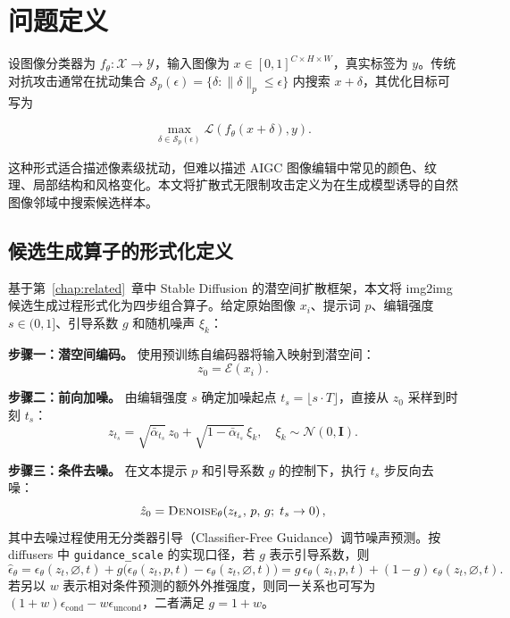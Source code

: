 \documentclass[type=bachelor,oneside]{fduthesis}
\begin{document}
\section{问题定义}

设图像分类器为 $f_\theta:\mathcal{X}\rightarrow\mathcal{Y}$，输入图像为 $x\in[0,1]^{C\times H\times W}$，真实标签为 $y$。传统对抗攻击通常在扰动集合 $\mathcal{S}_p(\epsilon)=\{\delta:\|\delta\|_p\leq\epsilon\}$ 内搜索 $x+\delta$，其优化目标可写为

\begin{equation}
  \max_{\delta \in \mathcal{S}_p(\epsilon)}
  \mathcal{L}(f_\theta(x+\delta),y).
  \label{eq:lp_attack_objective}
\end{equation}

这种形式适合描述像素级扰动，但难以描述 AIGC 图像编辑中常见的颜色、纹理、局部结构和风格变化。本文将扩散式无限制攻击定义为在生成模型诱导的自然图像邻域中搜索候选样本。

\subsection{候选生成算子的形式化定义}

基于第~\ref{chap:related}~章中 Stable Diffusion 的潜空间扩散框架，本文将 img2img 候选生成过程形式化为四步组合算子。给定原始图像 $x_i$、提示词 $p$、编辑强度 $s\in(0,1]$、引导系数 $g$ 和随机噪声 $\xi_k$：

\textbf{步骤一：潜空间编码。} 使用预训练自编码器将输入映射到潜空间：
\begin{equation}
  z_0 = \mathcal{E}(x_i).
  \label{eq:img2img_encode}
\end{equation}

\textbf{步骤二：前向加噪。} 由编辑强度 $s$ 确定加噪起点 $t_s = \lfloor s \cdot T \rfloor$，直接从 $z_0$ 采样到时刻 $t_s$：
\begin{equation}
  z_{t_s} = \sqrt{\bar{\alpha}_{t_s}}\, z_0 + \sqrt{1-\bar{\alpha}_{t_s}}\, \xi_k, \quad \xi_k \sim \mathcal{N}(0,\mathbf{I}).
  \label{eq:img2img_noise}
\end{equation}

\textbf{步骤三：条件去噪。} 在文本提示 $p$ 和引导系数 $g$ 的控制下，执行 $t_s$ 步反向去噪：
\begin{equation}
  \hat{z}_0 = \textsc{Denoise}_\theta\!\left(z_{t_s},\, p,\, g;\; t_s \to 0\right),
  \label{eq:img2img_denoise}
\end{equation}
其中去噪过程使用无分类器引导（Classifier-Free Guidance）调节噪声预测。按 diffusers 中 \texttt{guidance\_scale} 的实现口径，若 $g$ 表示引导系数，则
\begin{equation}
  \hat{\epsilon}_\theta
  = \epsilon_\theta(z_t,\varnothing,t)
  + g\bigl(\epsilon_\theta(z_t,p,t)-\epsilon_\theta(z_t,\varnothing,t)\bigr)
  = g\,\epsilon_\theta(z_t,p,t) + (1-g)\,\epsilon_\theta(z_t,\varnothing,t).
  \label{eq:cfg_diffusers}
\end{equation}
若另以 $w$ 表示相对条件预测的额外外推强度，则同一关系也可写为 $(1+w)\epsilon_{\text{cond}}-w\epsilon_{\text{uncond}}$，二者满足 $g=1+w$。
\end{document}
